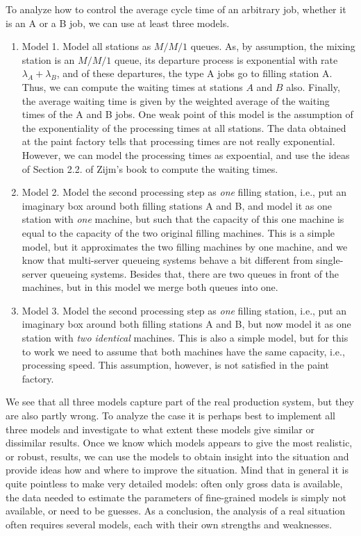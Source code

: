 To analyze how to control the average cycle time of an arbitrary job,
whether it is an A or a B job, we can use at least three models.
\begin{enumerate}
\item Model 1. Model all stations as $M/M/1$ queues. As, by
  assumption, the mixing station is an $M/M/1$ queue, its departure
  process is exponential with rate $\lambda_A + \lambda_B$, and of
  these departures, the type A jobs go to filling station A. Thus, we
  can compute the waiting times at stations $A$ and $B$ also. Finally,
  the average waiting time is given by the weighted average of the
  waiting times of the A and B jobs. One weak point of this model is
  the assumption of the exponentiality of the processing times at all
  stations. The data obtained at the paint factory tells that
  processing times are not really exponential.  However, we can model
  the processing times as expoential, and use the ideas of Section
  2.2. of Zijm's book to compute the waiting times.
\item Model 2. Model the second processing step as \emph{one} filling
  station, i.e., put an imaginary box around both filling stations A
  and B, and model it as one station with \emph{one} machine, but such
  that the capacity of this one machine is equal to the capacity of
  the two original filling machines. This is a simple model, but it
  approximates the two filling machines by one machine, and we know
  that multi-server queueing systems behave a bit different from
  single-server queueing systems. Besides that, there are two queues
  in front of the machines, but in this model we merge both queues
  into one.
\item Model 3. Model the second processing step as \emph{one} filling
  station, i.e., put an imaginary box around both filling stations A
  and B, but now model it as one station with \emph{two identical}
  machines.  This is also a simple model, but for this to work we need
  to assume that both machines have the same capacity, i.e.,
  processing speed. This assumption, however, is not satisfied in the
  paint factory.
\end{enumerate}

We see that all three models capture part of the real production
system, but they are also partly wrong.  To analyze the case it is
perhaps best to implement all three models and investigate to what
extent these models give similar or dissimilar results. Once we know
which models appears to give the most realistic, or robust, results,
we can use the models to obtain insight into the situation and provide
ideas how and where to improve the situation. Mind that in general it
is quite pointless to make very detailed models: often only gross data
is available, the data needed to estimate the parameters of
fine-grained models is simply not available, or need to be guesses.
As a conclusion, the analysis of a real situation often requires several
models, each with their own strengths and weaknesses.


